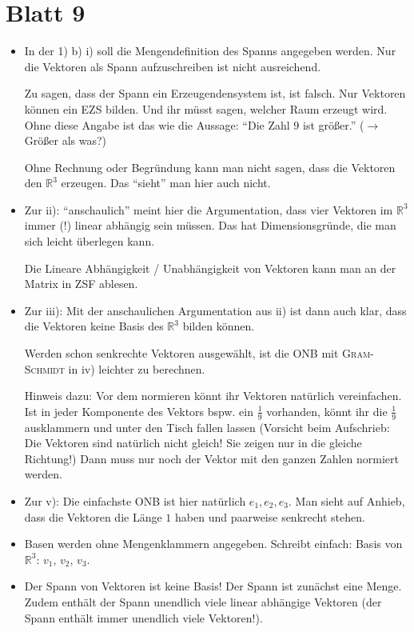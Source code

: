 \documentclass[11pt, a4paper]{article}
\newcommand{\R}{\mathbb{R}}
\begin{document}
\section*{Blatt 9}
\begin{itemize}
\item In der 1) b) i) soll die Mengendefinition des Spanns angegeben werden. Nur die Vektoren als Spann aufzuschreiben ist nicht ausreichend.

Zu sagen, dass der Spann ein Erzeugendensystem ist, ist falsch. Nur Vektoren können ein EZS bilden. Und ihr müsst sagen, welcher Raum erzeugt wird. Ohne diese Angabe ist das wie die Aussage: \enquote{Die Zahl $9$ ist größer.} ($\rightarrow$ Größer als was?)

Ohne Rechnung oder Begründung kann man nicht sagen, dass die Vektoren den $\R^3$ erzeugen. Das \enquote{sieht} man hier auch nicht. 

\item Zur ii): \enquote{anschaulich} meint hier die Argumentation, dass vier Vektoren im $\R^3$ immer (!) linear abhängig sein müssen. Das hat Dimensionsgründe, die man sich leicht überlegen kann.

Die Lineare Abhängigkeit / Unabhängigkeit von Vektoren kann man an der Matrix in ZSF ablesen.

\item Zur iii): Mit der anschaulichen Argumentation aus ii) ist dann auch klar, dass die Vektoren keine Basis des $\R^3$ bilden können. 

Werden schon senkrechte Vektoren ausgewählt, ist die ONB mit \textsc{Gram-Schmidt} in iv) leichter zu berechnen.

Hinweis dazu: Vor dem normieren könnt ihr Vektoren natürlich vereinfachen. Ist in jeder Komponente des Vektors bspw. ein $\frac{1}{9}$ vorhanden, könnt ihr die $\frac{1}{9}$ ausklammern und unter den Tisch fallen lassen (Vorsicht beim Aufschrieb: Die Vektoren sind natürlich nicht gleich! Sie zeigen nur in die gleiche Richtung!) Dann muss nur noch der Vektor mit den ganzen Zahlen normiert werden.

\item Zur v): Die einfachste ONB ist hier natürlich $e_1, e_2, e_3$. Man sieht auf Anhieb, dass die Vektoren die Länge $1$ haben und paarweise senkrecht stehen.

\item Basen werden ohne Mengenklammern angegeben. Schreibt einfach: Basis von $\R^3$: $v_1$, $v_2$, $v_3$.

\item Der Spann von Vektoren ist keine Basis! Der Spann ist zunächst eine Menge. Zudem enthält der Spann unendlich viele linear abhängige Vektoren (der Spann enthält immer unendlich viele Vektoren!). 


\end{itemize}
\end{document}
